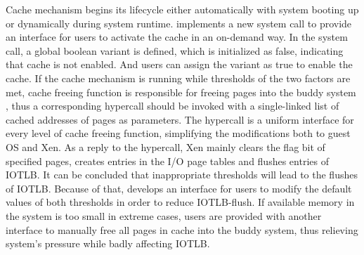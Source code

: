 Cache mechanism begins its lifecycle either automatically with system booting up or dynamically during system runtime. \name implements a new system call to provide an interface for users to activate the cache in an on-demand way. In the system call, a global boolean variant is defined, which is initialized as false, indicating that cache is not enabled. And users can assign the variant as true to enable the cache. If the cache mechanism is running while thresholds of the two factors are met, cache freeing function is responsible for freeing pages into the buddy system , thus a corresponding hypercall should be invoked with a single-linked list of cached addresses of pages as parameters. The hypercall is a uniform interface for every level of cache freeing function, simplifying the modifications both to guest OS and Xen. As a reply to the hypercall, Xen mainly clears the flag bit of specified pages, creates entries in the I/O page tables and flushes entries of IOTLB. It can be concluded that inappropriate thresholds will lead to the flushes of IOTLB. Because of that, \name develops an interface for users to modify the default values of both thresholds in order to reduce IOTLB-flush. If available memory in the system is too small in extreme cases, users are provided with another interface to manually free all pages in cache into the buddy system, thus relieving system's pressure while badly affecting IOTLB.
 


